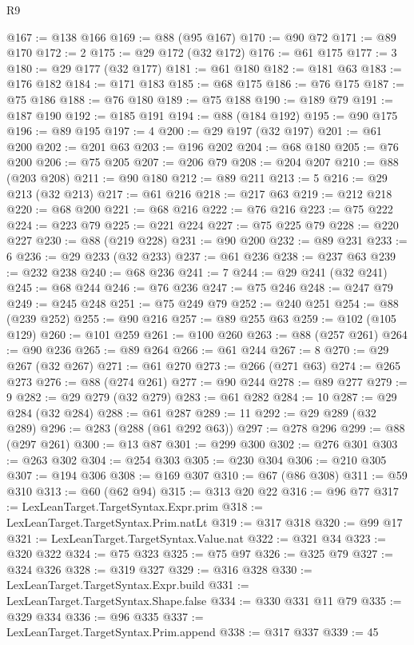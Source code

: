 \begin{lexlean}{R9}
\begin{coremodule}
@167 := @138 @166
@169 := @88 (@95 @167)
@170 := @90 @72
@171 := @89 @170
@172 := 2
@175 := @29 @172 (@32 @172)
@176 := @61 @175
@177 := 3
@180 := @29 @177 (@32 @177)
@181 := @61 @180
@182 := @181 @63
@183 := @176 @182
@184 := @171 @183
@185 := @68 @175
@186 := @76 @175
@187 := @75 @186
@188 := @76 @180
@189 := @75 @188
@190 := @189 @79
@191 := @187 @190
@192 := @185 @191
@194 := @88 (@184 @192)
@195 := @90 @175
@196 := @89 @195
@197 := 4
@200 := @29 @197 (@32 @197)
@201 := @61 @200
@202 := @201 @63
@203 := @196 @202
@204 := @68 @180
@205 := @76 @200
@206 := @75 @205
@207 := @206 @79
@208 := @204 @207
@210 := @88 (@203 @208)
@211 := @90 @180
@212 := @89 @211
@213 := 5
@216 := @29 @213 (@32 @213)
@217 := @61 @216
@218 := @217 @63
@219 := @212 @218
@220 := @68 @200
@221 := @68 @216
@222 := @76 @216
@223 := @75 @222
@224 := @223 @79
@225 := @221 @224
@227 := @75 @225 @79
@228 := @220 @227
@230 := @88 (@219 @228)
@231 := @90 @200
@232 := @89 @231
@233 := 6
@236 := @29 @233 (@32 @233)
@237 := @61 @236
@238 := @237 @63
@239 := @232 @238
@240 := @68 @236
@241 := 7
@244 := @29 @241 (@32 @241)
@245 := @68 @244
@246 := @76 @236
@247 := @75 @246
@248 := @247 @79
@249 := @245 @248
@251 := @75 @249 @79
@252 := @240 @251
@254 := @88 (@239 @252)
@255 := @90 @216
@257 := @89 @255 @63
@259 := @102 (@105 @129)
@260 := @101 @259
@261 := @100 @260
@263 := @88 (@257 @261)
@264 := @90 @236
@265 := @89 @264
@266 := @61 @244
@267 := 8
@270 := @29 @267 (@32 @267)
@271 := @61 @270
@273 := @266 (@271 @63)
@274 := @265 @273
@276 := @88 (@274 @261)
@277 := @90 @244
@278 := @89 @277
@279 := 9
@282 := @29 @279 (@32 @279)
@283 := @61 @282
@284 := 10
@287 := @29 @284 (@32 @284)
@288 := @61 @287
@289 := 11
@292 := @29 @289 (@32 @289)
@296 := @283 (@288 (@61 @292 @63))
@297 := @278 @296
@299 := @88 (@297 @261)
@300 := @13 @87
@301 := @299 @300
@302 := @276 @301
@303 := @263 @302
@304 := @254 @303
@305 := @230 @304
@306 := @210 @305
@307 := @194 @306
@308 := @169 @307
@310 := @67 (@86 @308)
@311 := @59 @310
@313 := @60 (@62 @94)
@315 := @313 @20 @22
@316 := @96 @77
@317 := LexLeanTarget.TargetSyntax.Expr.prim
@318 := LexLeanTarget.TargetSyntax.Prim.natLt
@319 := @317 @318
@320 := @99 @17
@321 := LexLeanTarget.TargetSyntax.Value.nat
@322 := @321 @34
@323 := @320 @322
@324 := @75 @323
@325 := @75 @97
@326 := @325 @79
@327 := @324 @326
@328 := @319 @327
@329 := @316 @328
@330 := LexLeanTarget.TargetSyntax.Expr.build
@331 := LexLeanTarget.TargetSyntax.Shape.false
@334 := @330 @331 @11 @79
@335 := @329 @334
@336 := @96 @335
@337 := LexLeanTarget.TargetSyntax.Prim.append
@338 := @317 @337
@339 := 45

\end{coremodule}
\end{lexlean}
